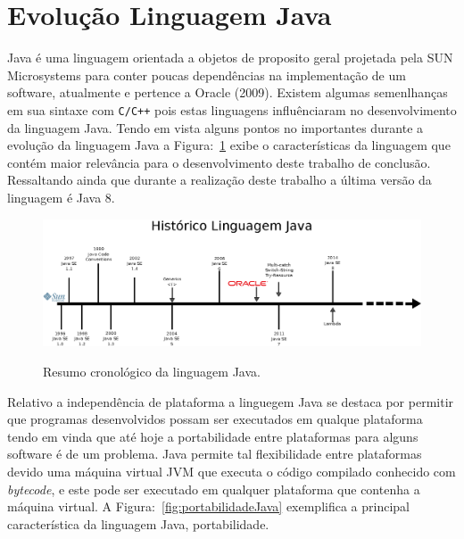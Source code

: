  
\section{Evoluç\~{a}o Linguagem Java}\label{sec:evolucaoJava}

Java \'{e} uma linguagem orientada a objetos de proposito geral projetada pela SUN Microsystems para conter poucas depend\^{e}ncias na implementa\c{c}\~{a}o de um software, atualmente e pertence a Oracle (2009). Existem algumas semenlhan\c{c}as em sua sintaxe com \texttt{C/C++} pois estas linguagens influ\^{e}nciaram no desenvolvimento da linguagem Java. Tendo em vista alguns pontos no importantes durante a evolu\c{c}\~{a}o da linguagem Java a Figura:~\ref{fig:timeLineJava} exibe o caracter\'{i}sticas da linguagem que cont\'{e}m  maior relev\^{a}ncia para o desenvolvimento deste trabalho de conclus\~{a}o. Ressaltando ainda que durante a realiza\c{c}\~{a}o deste trabalho a \'{u}ltima vers\~{a}o  da linguagem \'{e} Java 8.

\begin{figure}[h]
	\center
	\includegraphics[scale=1]{Imagens/timeLineJava}
	\label{fig:timeLineJava}
	\caption{Resumo cronol\'{o}gico da linguagem Java.}
\end{figure}

Relativo a independ\^{e}ncia de plataforma a linguegem Java se destaca por permitir que programas desenvolvidos possam ser executados em qualque plataforma tendo em vinda que at\'{e} hoje a portabilidade entre plataformas para alguns software \'{e} de um problema. Java permite tal flexibilidade entre plataformas devido uma m\'{a}quina virtual \acs{JVM} que executa o c\'{o}digo compilado conhecido com \textit{bytecode}, e este pode ser executado em qualquer plataforma que contenha a m\'{a}quina virtual. A Figura:~\ref{fig:portabilidadeJava} exemplifica a principal caracter\'{i}stica da linguagem Java, portabilidade.


